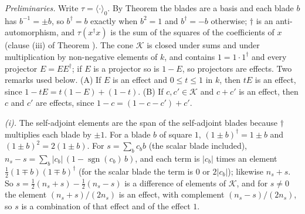 \emph{Preliminaries.} Write $\tau = \langle\cdot\rangle_{0}$. By Theorem  the blades are a basis and each blade $b$ has $b^{-1} = \pm b$, so $b^{\dagger} = b$ exactly when $b^{2} = 1$ and $b^{\dagger} = -b$ otherwise; $\dagger$ is an anti-automorphism, and $\tau(x^{\dagger}x)$ is the sum of the squares of the coefficients of $x$ (clause (iii) of Theorem ). The cone $\mathcal{K}$ is closed under sums and under multiplication by non-negative elements of $k$, and contains $1 = 1 \cdot 1^{\dagger}$ and every projector $E = EE^{\dagger}$; if $E$ is a projector so is $1 - E$, so projectors are effects. Two remarks used below. (A) If $E$ is an effect and $0 \le t \le 1$ in $k$, then $tE$ is an effect, since $1 - tE = t(1 - E) + (1 - t)$. (B) If $c, c' \in \mathcal{K}$ and $c + c'$ is an effect, then $c$ and $c'$ are effects, since $1 - c = (1 - c - c') + c'$.

\emph{(i).} The self-adjoint elements are the span of the self-adjoint blades because $\dagger$ multiplies each blade by $\pm 1$. For a blade $b$ of square $1$, $(1 \pm b)^{\dagger} = 1 \pm b$ and $(1 \pm b)^{2} = 2(1 \pm b)$. For $s = \sum_{b}c_{b}b$ (the scalar blade included), $n_{s} - s = \sum_{b}|c_{b}|\,(1 - \operatorname{sgn}(c_{b})\,b)$, and each term is $|c_{b}|$ times an element $\tfrac12(1 \mp b)(1 \mp b)^{\dagger}$ (for the scalar blade the term is $0$ or $2|c_{b}|$); likewise $n_{s} + s$. So $s = \tfrac12(n_{s} + s) - \tfrac12(n_{s} - s)$ is a difference of elements of $\mathcal{K}$, and for $s \ne 0$ the element $(n_{s} + s)/(2n_{s})$ is an effect, with complement $(n_{s} - s)/(2n_{s})$, so $s$ is a combination of that effect and of the effect $1$.

